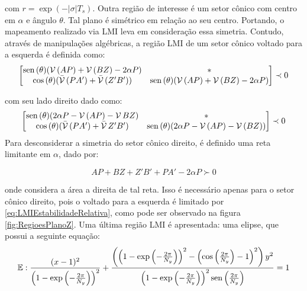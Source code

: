 \noindent com $r = \exp{\left(-|\sigma|T_s\right)}$. Outra região de interesse é um setor cônico com centro em $\alpha$ e ângulo $\theta$. Tal plano é simétrico em relação ao seu centro. Portando, o mapeamento realizado via LMI leva em consideração essa simetria. Contudo, através de manipulações algébricas, a região LMI de um setor cônico voltado para a esquerda é definida como:
\begin{equation}
  \begin{bmatrix*}[c]
    \sen{(\theta)(\Herm{(AP)} + \Herm{(BZ)} -2\alpha P)} &  * \\
    \cos{(\theta)(\herm{(PA')} + \herm{(Z'B')})}      &  \sen{(\theta)(\Herm{(AP)} + \Herm{(BZ)} -2\alpha P)}
  \end{bmatrix*}
  \prec 0\label{eq:LMIESetorConicoEsquerdo}
\end{equation}

\noindent com seu lado direito dado como:
\begin{equation}
  \begin{bmatrix*}[c]
    \sen{(\theta)(2\alpha P - \Herm{(AP)} - \Herm{BZ})} & * \\
    \cos{(\theta)(\herm{(PA')} + \herm{Z'B'})}       & \sen{(\theta)(2\alpha P - \Herm{(AP)} - \Herm{(BZ)})}
  \end{bmatrix*}
  \prec 0\label{eq:LMIESetorConicoDireito}
\end{equation}
Para desconsiderar a simetria do setor cônico direito, é definido uma reta limitante em $\alpha$, dado por:

\begin{equation}
  AP + BZ + Z'B' + PA' -2\alpha P\label{eq:LMIRightBounded} \succ 0
\end{equation}

\noindent onde considera a área a direita de tal reta. Isso é necessário apenas para o setor cônico direito, pois o voltado para a  esquerda é limitado por \eqref{eq:LMIEstabilidadeRelativa}, como pode ser observado na figura \ref{fig:RegioesPlanoZ}. Uma última região LMI é apresentada: uma elipse, que possui a seguinte equação\cite{CHIQUETO2021}:
\begin{equation}
  \mathbb{E}: \dfrac{(x-1)^2}{\left(1-\exp{\left(-\frac{2\pi}{N_y}\right)}\right)^2} + \dfrac{\left(\left(1-\exp{\left(-\frac{2\pi}{N_y}\right)}\right)^2 - \left(\cos{\left(\frac{2\pi}{N_y}\right)} - 1\right)^2\right)y^2}{\left(1-\exp{\left(-\frac{2\pi}{N_y}\right)}\right)^2\operatorname{sen}{\left(\frac{2\pi}{N_y}\right)}} = 1\label{eq:Elipse}
\end{equation}

